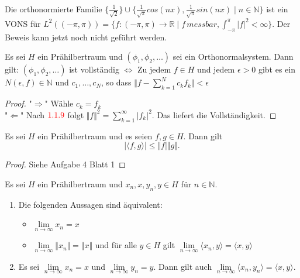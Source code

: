 \documentclass[12pt,titlepage]{article}
\begin{document}
 \begin{bsp}
 Die orthonormierte Familie $\{\frac{1}{\sqrt{2}}\}\cup \{\frac{1}{\sqrt{\pi}}cos(nx),\frac{1}{\sqrt{\pi}}sin(nx)\mid n \in \mathbb{N}\}$ ist ein VONS für $L^2((-\pi,\pi))=\{f:(-\pi,\pi)\to \mathbb{R} \mid f \, messbar, \int_{-\pi}^\pi \vert f \vert^2 < \infty\}$. Der Beweis kann jetzt noch nicht geführt werden.
 \end{bsp}
\begin{bemerkung}
Es sei $H$ ein Prähilbertraum und $(\phi_1,\phi_2,\ldots)$ sei ein Orthonormalsystem. Dann gilt: $(\phi_1,\phi_2,\ldots)$ ist vollständig $\Leftrightarrow$ Zu jedem $f\in H$ und jedem $\epsilon>0 $ gibt es ein $N(\epsilon,f) \in \mathbb{N}$ und $c_1 ,\ldots,c_N$, so dass $ \Vert f- \sum_{k=1}^N c_kf_k \Vert <\epsilon$
\end{bemerkung}
\begin{proof}
"$\Rightarrow$" Wähle $c_k=f_k$\\
"$\Leftarrow$" Nach $\textcolor{red}{1.1.9}$ folgt $\Vert f \Vert^2=\sum_{k=1}^{\infty}\vert f_k\vert^2 $. Das liefert die Vollständigkeit.
\end{proof}
\begin{satz}
Es sei $H$ ein Prähilbertraum und es seien $f,g \in H$. Dann gilt 
\[
\vert \langle f,g \rangle\vert \leq \Vert f \vert \Vert g\Vert.
\]
\end{satz}
\begin{proof}
Siehe Aufgabe 4 Blatt 1
\end{proof}
\begin{bemerkung}
Es sei $H$ ein Prähilbertraum und $x_n,x,y_n,y\in H$ für $n\in \mathbb{N}$.
\begin{enumerate}
\item  Die folgenden Aussagen sind äquivalent:
\begin{itemize}
\item $\underset{n \rightarrow \infty}{\lim} x_n=x$
\item $\underset{n \rightarrow \infty}{\lim} \Vert x_n \Vert =\Vert x \Vert$ und für alle $y\in H$ gilt $\underset{n \rightarrow \infty}{\lim} \langle x_n,y \rangle= \langle x,y \rangle$
\end{itemize}
\item Es sei $\underset{n \rightarrow \infty}{\lim} x_n =x$ und $\underset{n \rightarrow \infty}{\lim} y_n=y$. Dann gilt auch $\underset{n \rightarrow \infty}{\lim} \langle x_n, y_n \rangle = \langle x,y \rangle.$
\end{enumerate}
\end{bemerkung}
%
\end{document}
